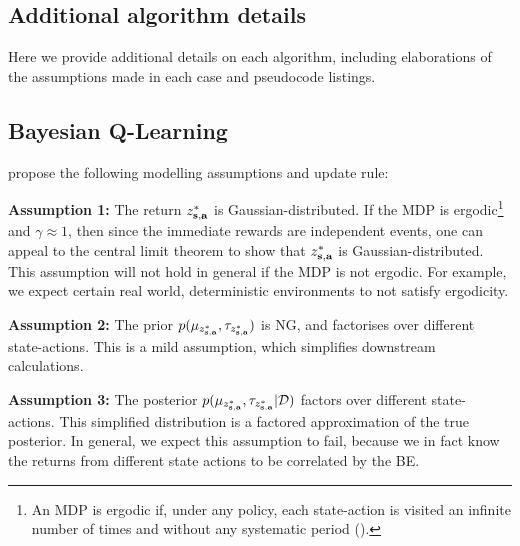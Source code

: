 \documentclass{article}
\begin{document}



\clearpage
\begin{appendices}
\section{Additional algorithm details}

Here we provide additional details on each algorithm, including elaborations of the assumptions made in each case and pseudocode listings.

\subsection{Bayesian Q-Learning} \label{app:bql}

\cite{bqlearning} propose the following modelling assumptions and update rule:

\textbf{Assumption 1:} The return $z^*_{\mathbf{s}, \mathbf{a}}$ is Gaussian-distributed. If the MDP is ergodic\footnote{An MDP is ergodic if, under any policy, each state-action is visited an infinite number of times and without any systematic period (\cite{silver}).} and $\gamma \approx 1$, then since the immediate rewards are independent events, one can appeal to the central limit theorem to show that $z^*_{\mathbf{s}, \mathbf{a}}$ is Gaussian-distributed. This assumption will not hold in general if the MDP is not ergodic. For example, we expect certain real world, deterministic environments to not satisfy ergodicity.

\textbf{Assumption 2:} The prior $p(\mu_{z^*_{\mathbf{s}, \mathbf{a}}}, \tau_{z^*_{\mathbf{s}, \mathbf{a}}})$ is NG, and factorises over different state-actions. This is a mild assumption, which simplifies downstream calculations.

\textbf{Assumption 3:} The posterior $p(\mu_{z^*_{\mathbf{s}, \mathbf{a}}}, \tau_{z^*_{\mathbf{s}, \mathbf{a}}}| \mathcal{D})$ factors over different state-actions. This simplified distribution is a factored approximation of the true posterior. In general, we expect this assumption to fail, because we in fact know the returns from different state actions to be correlated by the BE.


\end{appendices}
\end{document}
